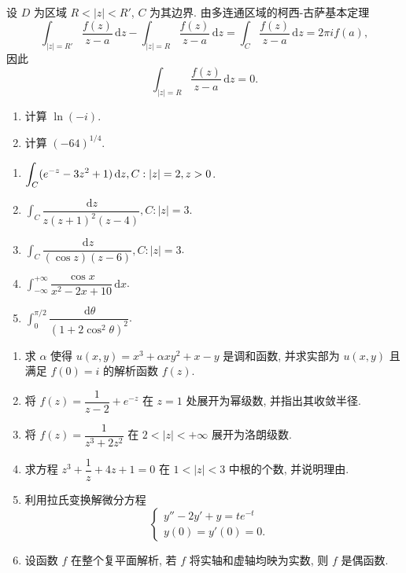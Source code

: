 \documentclass[simple]{hfutexam}
\newcommand{\diff}{\,\mathrm{d}}
\let\Im\relax
\DeclareMathOperator\Im{Im}
\begin{document}
设 $D$ 为区域 $R<|z|<R'$, $C$ 为其边界.
由多连通区域的柯西-古萨基本定理
\[\int_{|z|=R'} \frac{f(z)}{z-a}\diff z-\int_{|z|=R} \frac{f(z)}{z-a}\diff z=\int_C \frac{f(z)}{z-a}\diff z=2\pi if(a),\]
因此
  \[\int_{|z|=R} \frac{f(z)}{z-a}\diff z=0.\]

\newpage
{}
\maketitle

\begin{enumerate}
\item 计算 $\ln (-i)$.
\item 计算 $(-64)^{1/4}$.
\end{enumerate}

\begin{enumerate}
\item $\displaystyle\int_C(e^{-z}-3z^2+1)\diff z, C:|z|=2,\Im z>0$.
\item $\displaystyle\int_C\dfrac{\diff z}{z(z+1)^2(z-4)}, C:|z|=3$.
\item $\displaystyle\int_C\dfrac{\diff z}{(\cos z)(z-6)}, C:|z|=3$.
\item $\displaystyle\int_{-\infty}^{+\infty}\dfrac{\cos x}{x^2-2x+10}\diff x$.
\item $\displaystyle\int_0^{\pi/2}\dfrac{\diff \theta}{(1+2\cos^2\theta)^2}$.
\end{enumerate}

\begin{enumerate}
\item 求 $\alpha$ 使得 $u(x,y)=x^3+\alpha xy^2+x-y$ 是调和函数, 并求实部为 $u(x,y)$ 且满足 $f(0)=i$ 的解析函数 $f(z)$.
\item 将 $f(z)=\dfrac{1}{z-2}+e^{-z}$ 在 $z=1$ 处展开为幂级数, 并指出其收敛半径.
\item 将 $f(z)=\dfrac{1}{z^3+2z^2}$ 在 $2<|z|<+\infty$ 展开为洛朗级数.
\item 求方程 $z^3+\dfrac{1}{z}+4z+1=0$ 在 $1<|z|<3$ 中根的个数, 并说明理由.
\item 利用拉氏变换解微分方程 
\[\begin{cases}
y''-2y'+y=te^{-t}&\\
y(0)=y'(0)=0.&
\end{cases}\]
\item 设函数 $f$ 在整个复平面解析, 若 $f$ 将实轴和虚轴均映为实数, 则 $f$ 是偶函数.
\end{enumerate}
\end{document}
